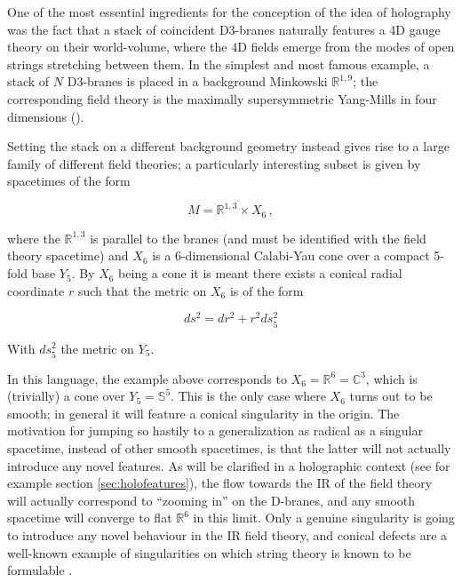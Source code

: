 \label{chap:cones}One of the most essential ingredients for the conception of the idea of holography was the fact that a stack of coincident D3-branes naturally features a 4D gauge theory on their world-volume, where the 4D fields emerge from the modes of open strings stretching between them. In the simplest and most famous example, a stack of $N$ D3-branes is placed in a background Minkowski $\mathbb{R}^{1,9}$; the corresponding field theory is the maximally supersymmetric Yang-Mills in four dimensions (\SYM).

Setting the stack on a different background geometry instead gives rise to a large family of different field theories; a particularly interesting subset is given by spacetimes of the form

\begin{equation} 
	M = \mathbb{R}^{1,3} \times X_6 \,,
\end{equation}

where the $\mathbb{R}^{1,3}$ is parallel to the branes (and must be identified with the field theory spacetime) and $X_6$ is a 6-dimensional Calabi-Yau cone over a compact 5-fold base $Y_5$. By $X_6$ being a cone it is meant there exists a conical radial coordinate $r$ such that the metric on $X_6$ is of the form

\begin{equation}
	ds^2 = dr^2 + r^2 ds_5^2
	\label{}
\end{equation}

With $ds_5^2$ the metric on $Y_5$.

In this language, the \SYM example above corresponds to $X_6 = \mathbb{R}^6 = \mathbb{C}^3$, which is (trivially) a cone over $Y_5 = \mathbb{S}^5$. This is the only case where $X_6$ turns out to be smooth; in general it will feature a conical singularity in the origin. The motivation for jumping so hastily to a generalization as radical as a singular spacetime, instead of other smooth spacetimes, is that the latter will not actually introduce any novel features. As will be clarified in a holographic context (see for example section \ref{sec:holofeatures}), the flow towards the IR of the field theory will actually correspond to ``zooming in'' on the D-branes, and any smooth spacetime will converge to flat $\mathbb{R}^6$ in this limit. Only a genuine singularity is going to introduce any novel behaviour in the IR field theory, and conical defects are a well-known example of singularities on which string theory is known to be formulable \cite{dixon1985strings}.

